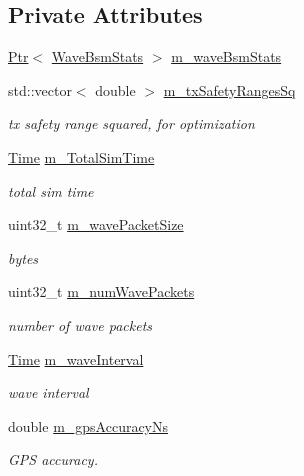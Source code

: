 \subsection*{Private Attributes}
\begin{DoxyCompactItemize}
\item 
\hyperlink{classns3_1_1Ptr}{Ptr}$<$ \hyperlink{classns3_1_1WaveBsmStats}{Wave\+Bsm\+Stats} $>$ \hyperlink{classns3_1_1BsmApplication_afc424d5340ea34ee3099625627b8c036}{m\+\_\+wave\+Bsm\+Stats}
\item 
std\+::vector$<$ double $>$ \hyperlink{classns3_1_1BsmApplication_a2e160b9460506f5d689f9a397504e13b}{m\+\_\+tx\+Safety\+Ranges\+Sq}
\begin{DoxyCompactList}\small\item\em tx safety range squared, for optimization \end{DoxyCompactList}\item 
\hyperlink{classns3_1_1Time}{Time} \hyperlink{classns3_1_1BsmApplication_a0f53d0889462a50b4982657ca6db083d}{m\+\_\+\+Total\+Sim\+Time}
\begin{DoxyCompactList}\small\item\em total sim time \end{DoxyCompactList}\item 
uint32\+\_\+t \hyperlink{classns3_1_1BsmApplication_a039fd69a7586ab2632da57b666e523bc}{m\+\_\+wave\+Packet\+Size}
\begin{DoxyCompactList}\small\item\em bytes \end{DoxyCompactList}\item 
uint32\+\_\+t \hyperlink{classns3_1_1BsmApplication_a35b423a2b33caa0f5455450e6775bde4}{m\+\_\+num\+Wave\+Packets}
\begin{DoxyCompactList}\small\item\em number of wave packets \end{DoxyCompactList}\item 
\hyperlink{classns3_1_1Time}{Time} \hyperlink{classns3_1_1BsmApplication_a99c61fbd55f10fd1e1e349739fadb178}{m\+\_\+wave\+Interval}
\begin{DoxyCompactList}\small\item\em wave interval \end{DoxyCompactList}\item 
double \hyperlink{classns3_1_1BsmApplication_a4c66027982c4d715a89e568ce5424eca}{m\+\_\+gps\+Accuracy\+Ns}
\begin{DoxyCompactList}\small\item\em G\+PS accuracy. \end{DoxyCompactList}\item 

\end{DoxyCompactItemize}
